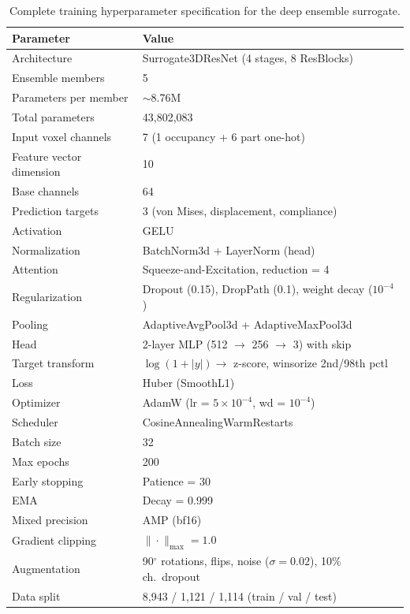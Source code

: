 \documentclass[11pt]{article}
\theoremstyle{plain}
\theoremstyle{definition}
\theoremstyle{remark}
\begin{document}
\begin{table}[h]
\centering
\caption{Complete training hyperparameter specification for the deep ensemble surrogate.}
\label{tab:hyperparams}
\small
\begin{tabular}{@{}ll@{}}
\toprule
\textbf{Parameter} & \textbf{Value} \\
\midrule
Architecture & Surrogate3DResNet (4 stages, 8 ResBlocks) \\
Ensemble members & 5 \\
Parameters per member & $\sim$8.76M \\
Total parameters & 43,802,083 \\
Input voxel channels & 7 (1 occupancy + 6 part one-hot) \\
Feature vector dimension & 10 \\
Base channels & 64 \\
Prediction targets & 3 (von Mises, displacement, compliance) \\
Activation & GELU \\
Normalization & BatchNorm3d + LayerNorm (head) \\
Attention & Squeeze-and-Excitation, reduction = 4 \\
Regularization & Dropout (0.15), DropPath (0.1), weight decay ($10^{-4}$) \\
Pooling & AdaptiveAvgPool3d + AdaptiveMaxPool3d \\
Head & 2-layer MLP (512 $\to$ 256 $\to$ 3) with skip \\
Target transform & $\log(1+|y|) \to$ z-score, winsorize 2nd/98th pctl \\
Loss & Huber (SmoothL1) \\
Optimizer & AdamW (lr = $5\times10^{-4}$, wd = $10^{-4}$) \\
Scheduler & CosineAnnealingWarmRestarts \\
Batch size & 32 \\
Max epochs & 200 \\
Early stopping & Patience = 30 \\
EMA & Decay = 0.999 \\
Mixed precision & AMP (bf16) \\
Gradient clipping & $\|\cdot\|_{\max} = 1.0$ \\
Augmentation & 90$^\circ$ rotations, flips, noise ($\sigma = 0.02$), 10\% ch.\ dropout \\
Data split & 8,943 / 1,121 / 1,114 (train / val / test) \\
\bottomrule
\end{tabular}
\end{table}
\end{document}
